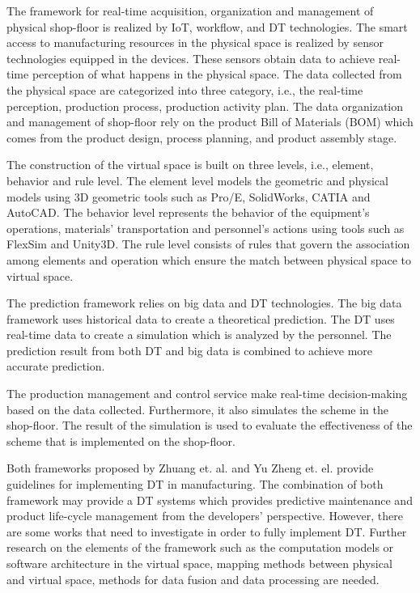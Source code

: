 \documentclass[article]{aaltoseries}
\begin{document}
The framework for real-time acquisition, organization and management of physical shop-floor is realized by IoT, workflow, and DT technologies. The smart access to manufacturing resources in the physical space is realized by sensor technologies equipped in the devices. These sensors obtain data to achieve real-time perception of what happens in the physical space. The data collected from the physical space are categorized into three category, i.e., the real-time perception, production process, production activity plan. The data organization and management of shop-floor rely on the product Bill of Materials (BOM) which comes from the product design, process planning, and product assembly stage.

The construction of the virtual space is built on three levels, i.e., element, behavior and rule level. The element level models the geometric and physical models using 3D geometric tools such as Pro/E, SolidWorks, CATIA and AutoCAD. The behavior level represents the behavior of the equipment's operations, materials' transportation and personnel's actions using tools such as FlexSim and Unity3D. The rule level consists of rules that govern the association among elements and operation which ensure the match between physical space to virtual space.

The prediction framework relies on big data and DT technologies. The big data framework uses historical data to create a theoretical prediction. The DT uses real-time data to create a simulation which is analyzed by the personnel. The prediction result from both DT and big data is combined to achieve more accurate prediction.

The production management and control service make real-time decision-making based on the data collected. Furthermore, it also simulates the scheme in the shop-floor. The result of the simulation is used to evaluate the effectiveness of the scheme that is implemented on the shop-floor.

Both frameworks proposed by Zhuang et. al. and Yu Zheng et. el. provide guidelines for implementing DT in manufacturing. The combination of both framework may provide a DT systems which provides predictive maintenance and product life-cycle management from the developers' perspective. However, there are some works that need to investigate in order to fully implement DT. Further research on the elements of the framework such as the computation models or software architecture in the virtual space, mapping methods between physical and virtual space, methods for data fusion and data processing are needed.
\end{document}
